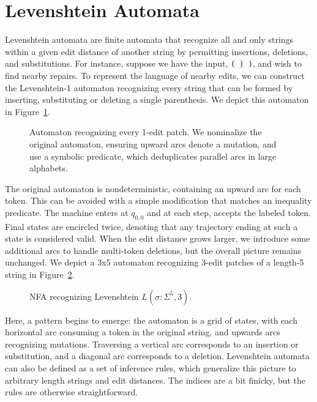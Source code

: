 \section{Levenshtein Automata}

Levenshtein automata are finite automata that recognize all and only strings within a given edit distance of another string by permitting insertions, deletions, and substitutions. For instance, suppose we have the input, \texttt{( ) )}, and wish to find nearby repairs. To represent the language of nearby edits, we can construct the Levenshtein-1 automaton recognizing every string that can be formed by inserting, substituting or deleting a single parenthesis. We depict this automaton in Figure~\ref{fig:lev_automaton}.

\begin{figure}[h!]
  
  \caption{Automaton recognizing every 1-edit patch. We nominalize the original automaton, ensuring upward arcs denote a mutation, and use a symbolic predicate, which deduplicates parallel arcs in large alphabets.}\label{fig:lev_automaton}\vspace{-5pt}
\end{figure}

The original automaton is nondeterministic, containing an upward arc for each token. This can be avoided with a simple modification that matches an inequality predicate. The machine enters at $q_{0, 0}$ and at each step, accepts the labeled token. Final states are encircled twice, denoting that any trajectory ending at such a state is considered valid.
When the edit distance grows larger, we introduce some additional arcs to handle multi-token deletions, but the overall picture remains unchanged. We depict a 3x5 automaton recognizing 3-edit patches of a length-5 string in Figure~\ref{fig:lev_nfa}.

\begin{figure}%
  \begin{center}
    
  \end{center}
  \caption{NFA recognizing Levenshtein $L(\sigma: \Sigma^5, 3)$.}\label{fig:lev_nfa}
\end{figure}

Here, a pattern begins to emerge: the automaton is a grid of states, with each horizontal arc consuming a token in the original string, and upwards arcs recognizing mutations. Traversing a vertical arc corresponds to an insertion or substitution, and a diagonal arc corresponds to a deletion. Levenshtein automata can also be defined as a set of inference rules, which generalize this picture to arbitrary length strings and edit distances. The indices are a bit finicky, but the rules are otherwise straightforward.

